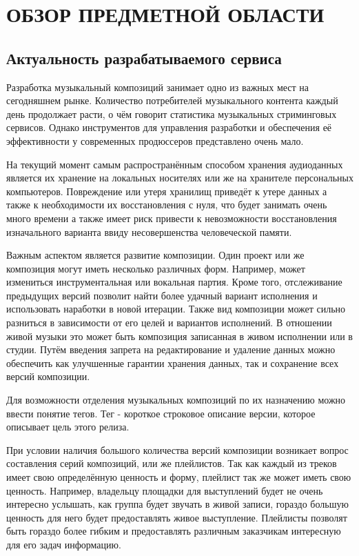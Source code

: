 \documentclass[a4paper, 12pt, oneside]{article}
\begin{document}
\section{ОБЗОР ПРЕДМЕТНОЙ ОБЛАСТИ}
\subsection{Актуальность разрабатываемого сервиса}

Разработка музыкальный композиций занимает одно из важных мест на сегодняшнем рынке. Количество
потребителей музыкального контента каждый день продолжает расти, о чём говорит статистика
музыкальных стриминговых сервисов. Однако инструментов
для управления разработки и обеспечения её эффективности у современных продюссеров представлено очень мало.

На текущий момент самым распространённым способом хранения аудиоданных является их хранение на локальных
носителях или же на хранителе персональных компьютеров. Повреждение или утеря хранилищ приведёт к
утере данных а также к необходимости их восстановления с нуля, что будет занимать
очень много времени а также имеет риск привести к невозможности восстановления изначального варианта ввиду
несовершенства человеческой памяти.

Важным аспектом является развитие композиции. Один проект или же композиция могут иметь несколько 
различных форм. Например, может измениться инструментальная или вокальная партия. Кроме того, отслеживание предыдущих
версий позволит найти более удачный вариант исполнения и использовать наработки в новой итерации. Также вид композиции 
может сильно разниться в зависимости от его целей и вариантов исполнений. В отношении живой музыки это может быть
композиция записанная в живом исполнении или в студии. Путём введения запрета на редактирование и удаление данных
можно обеспечить как улучшенные гарантии хранения данных, так и сохранение всех версий композиции.

Для возможности отделения музыкальных композиций по их назначению можно ввести понятие тегов. Тег - короткое 
строковое описание версии, которое описывает цель этого релиза.

При условии наличия большого количества версий композиции возникает вопрос составления серий композиций, или же плейлистов. 
Так как каждый из треков имеет свою определённую ценность и форму, плейлист так же может иметь свою ценность. 
Например, владельцу площадки для выступлений будет не очень интересно услышать, как группа будет звучать в живой записи, гораздо большую ценность
для него будет предоставлять живое выступление. Плейлисты позволят быть гораздо более гибким и предоставлять
различным заказчикам интересную для его задач информацию.
\end{document}
